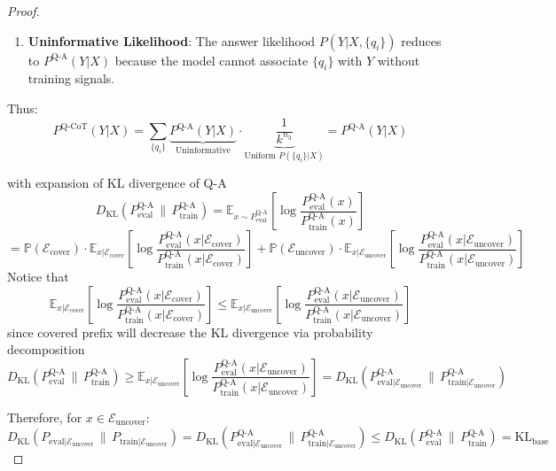\begin{proof}
\begin{enumerate}
    \item \textbf{Uninformative Likelihood}: The answer likelihood $P(Y|X, \{q_i\})$ reduces to $P^{\text{Q-A}}(Y|X)$ because the model cannot associate $\{q_i\}$ with $Y$ without training signals.
\end{enumerate}

Thus:
\[
P^{\text{Q-CoT}}(Y|X) = \sum_{\{q_i\}} \underbrace{P^{\text{Q-A}}(Y|X)}_{\text{Uninformative}} \cdot \underbrace{\frac{1}{k^{n_{3}}}}_{\text{Uniform } P(\{q_i\}|X)} = P^{\text{Q-A}}(Y|X)
\]

with expansion of KL divergence of Q-A
\[
D_{\mathrm{KL}}\left(P_{\text{eval}}^{\text{Q-A}} \,\big\|\, P_{\text{train}}^{\text{Q-A}}\right) = \mathbb{E}_{x \sim P_{\text{eval}}^{\text{Q-A}}} \left[ \log \frac{P_{\text{eval}}^{\text{Q-A}}(x)}{P_{\text{train}}^{\text{Q-A}}(x)} \right]
\] 
\[
= \mathbb{P}(\mathcal{E}_{\text{cover}}) \cdot \mathbb{E}_{x|\mathcal{E}_{\text{cover}}} \left[ \log \frac{P_{\text{eval}}^{\text{Q-A}}(x|\mathcal{E}_{\text{cover}})}{P_{\text{train}}^{\text{Q-A}}(x|\mathcal{E}_{\text{cover}})} \right] + \mathbb{P}(\mathcal{E}_{\text{uncover}}) \cdot \mathbb{E}_{x|\mathcal{E}_{\text{uncover}}} \left[ \log \frac{P_{\text{eval}}^{\text{Q-A}}(x|\mathcal{E}_{\text{uncover}})}{P_{\text{train}}^{\text{Q-A}}(x|\mathcal{E}_{\text{uncover}})} \right]
\]
Notice that
\[
\mathbb{E}_{x|\mathcal{E}_{\text{cover}}} \left[ \log \frac{P_{\text{eval}}^{\text{Q-A}}(x|\mathcal{E}_{\text{cover}})}{P_{\text{train}}^{\text{Q-A}}(x|\mathcal{E}_{\text{cover}})} \right]
\leq
\mathbb{E}_{x|\mathcal{E}_{\text{uncover}}} \left[ \log \frac{P_{\text{eval}}^{\text{Q-A}}(x|\mathcal{E}_{\text{uncover}})}{P_{\text{train}}^{\text{Q-A}}(x|\mathcal{E}_{\text{uncover}})} \right]
\]
since covered prefix will decrease the KL divergence via probability decomposition
\[
D_{\mathrm{KL}}\left(P_{\text{eval}}^{\text{Q-A}} \,\big\|\, P_{\text{train}}^{\text{Q-A}}\right) \geq 
\mathbb{E}_{x|\mathcal{E}_{\text{uncover}}} \left[ \log \frac{P_{\text{eval}}^{\text{Q-A}}(x|\mathcal{E}_{\text{uncover}})}{P_{\text{train}}^{\text{Q-A}}(x|\mathcal{E}_{\text{uncover}})} \right] = D_{\mathrm{KL}}\left(P_{\text{eval}|\mathcal{E}_{\text{uncover}}}^{\text{Q-A}} \,\big\|\, P_{\text{train}|\mathcal{E}_{\text{uncover}}}^{\text{Q-A}}\right)
\]

Therefore, for $x \in \mathcal{E}_{\text{uncover}}$:
\[
D_{\mathrm{KL}}\left(P_{\text{eval}|\mathcal{E}_{\text{uncover}}} \,\big\|\, P_{\text{train}|\mathcal{E}_{\text{uncover}}}\right) = 
D_{\mathrm{KL}}\left(P_{\text{eval}|\mathcal{E}_{\text{uncover}}}^{\text{Q-A}} \,\big\|\, P_{\text{train}|\mathcal{E}_{\text{uncover}}}^{\text{Q-A}}\right) \leq 
D_{\mathrm{KL}}\left(P_{\text{eval}}^{\text{Q-A}} \,\big\|\, P_{\text{train}}^{\text{Q-A}}\right) = \mathrm{KL}_{\text{base}}
\]


\end{proof}
